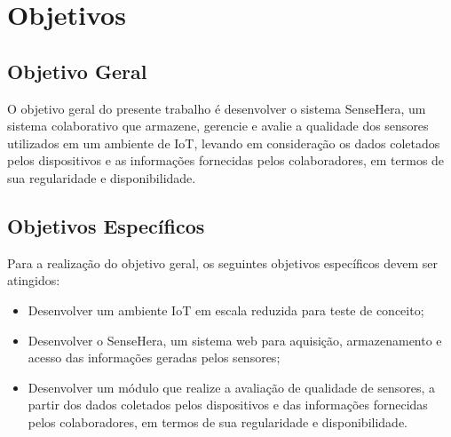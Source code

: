 \section{Objetivos}
\label{sec:objetivo}
\subsection{Objetivo Geral}
\qquad O objetivo geral do presente trabalho é desenvolver o sistema SenseHera, um sistema colaborativo que armazene, gerencie e avalie a qualidade dos sensores utilizados em um ambiente de \acrlong{IoT}, levando em consideração os dados coletados pelos dispositivos e as informações fornecidas pelos colaboradores, em termos de sua regularidade e disponibilidade.
\subsection{Objetivos Específicos}
Para a realização do objetivo geral, os seguintes objetivos específicos devem ser atingidos:
\begin{itemize}
  \item Desenvolver um ambiente \acrshort{IoT} em escala reduzida para teste de conceito;
  \item Desenvolver o SenseHera, um sistema web para aquisição, armazenamento e acesso das informações geradas pelos sensores;
  \item Desenvolver um módulo que realize a avaliação de qualidade de sensores, a partir dos dados coletados pelos dispositivos e das informações fornecidas pelos colaboradores, em termos de sua regularidade e disponibilidade.
\end{itemize}
